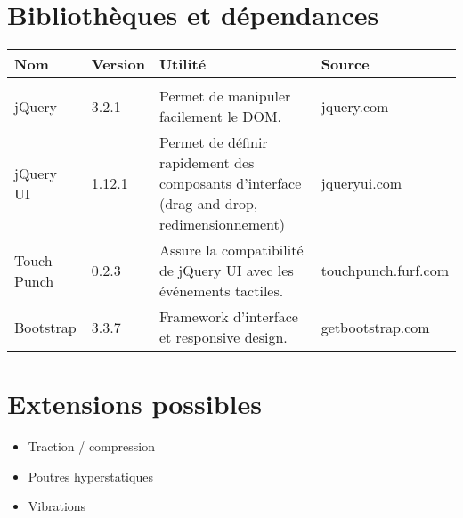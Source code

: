 \documentclass[draft]{report}
\begin{document}
\chapter{Bibliothèques et dépendances}

\noindent
\begin{tabularx}{\textwidth}{llXl}
Nom & Version & Utilité & Source \\
\hline\\
jQuery & 3.2.1 & Permet de manipuler facilement le DOM. & jquery.com \\
jQuery UI & 1.12.1 & Permet de définir rapidement des composants d'interface (drag and drop, redimensionnement) & jqueryui.com \\
Touch Punch & 0.2.3 & Assure la compatibilité de jQuery UI avec les événements tactiles. & touchpunch.furf.com \\
Bootstrap & 3.3.7 & Framework d'interface et responsive design. & getbootstrap.com \\
\end{tabularx}


\chapter{Extensions possibles}

\begin{itemize}
\item Traction / compression
\item Poutres hyperstatiques
\item Vibrations
\end{itemize}
\end{document}
